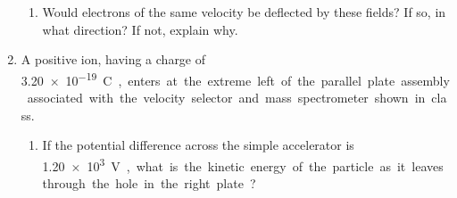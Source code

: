 \begin{enumerate}[itemsep=6pt]
\begin{enumerate}[itemsep=3pt]
    \item Would electrons of the same velocity be deflected by these fields? If
    so, in what direction? If not, explain why.
    \vspace{\stretch1}
  \end{enumerate}
    
%

\item A positive ion, having a charge of \SI{3.20e-19}\coulomb, enters at the
  extreme left of the parallel plate assembly associated with the velocity
  selector and mass spectrometer shown in class.
  \begin{enumerate}[itemsep=3pt]
  \item If the potential difference across the simple accelerator is
    \SI{1.20e3}\volt, what is the kinetic energy of the particle as it leaves
    through the hole in the right plate?
    

\end{enumerate}
\end{enumerate}
